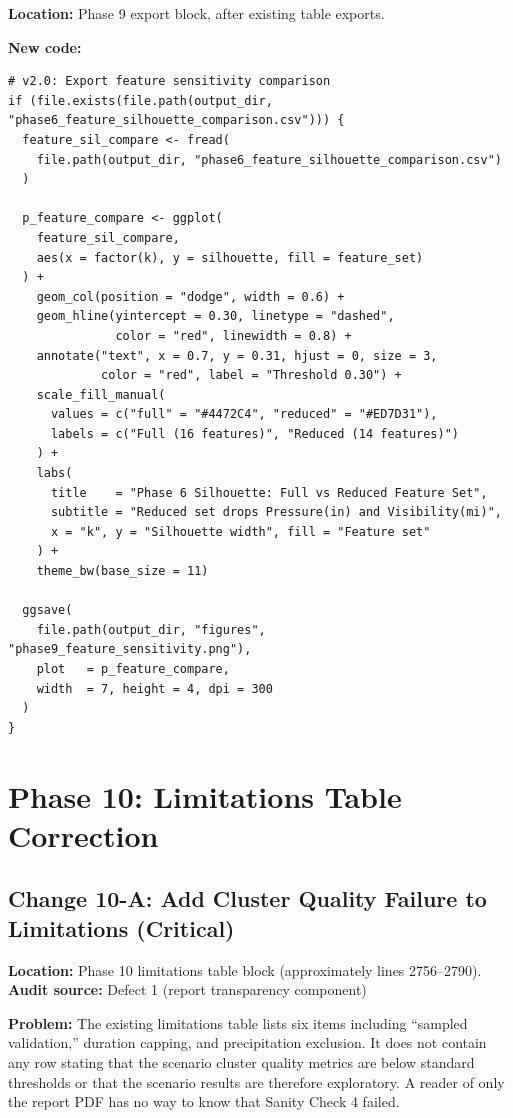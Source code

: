 \documentclass[11pt]{article}
\begin{document}
\textbf{Location:} Phase 9 export block, after existing table exports.

\textbf{New code:}
\begin{lstlisting}
# v2.0: Export feature sensitivity comparison
if (file.exists(file.path(output_dir, "phase6_feature_silhouette_comparison.csv"))) {
  feature_sil_compare <- fread(
    file.path(output_dir, "phase6_feature_silhouette_comparison.csv")
  )

  p_feature_compare <- ggplot(
    feature_sil_compare,
    aes(x = factor(k), y = silhouette, fill = feature_set)
  ) +
    geom_col(position = "dodge", width = 0.6) +
    geom_hline(yintercept = 0.30, linetype = "dashed",
               color = "red", linewidth = 0.8) +
    annotate("text", x = 0.7, y = 0.31, hjust = 0, size = 3,
             color = "red", label = "Threshold 0.30") +
    scale_fill_manual(
      values = c("full" = "#4472C4", "reduced" = "#ED7D31"),
      labels = c("Full (16 features)", "Reduced (14 features)")
    ) +
    labs(
      title    = "Phase 6 Silhouette: Full vs Reduced Feature Set",
      subtitle = "Reduced set drops Pressure(in) and Visibility(mi)",
      x = "k", y = "Silhouette width", fill = "Feature set"
    ) +
    theme_bw(base_size = 11)

  ggsave(
    file.path(output_dir, "figures", "phase9_feature_sensitivity.png"),
    plot   = p_feature_compare,
    width  = 7, height = 4, dpi = 300
  )
}
\end{lstlisting}

\section{Phase 10: Limitations Table Correction}

\subsection{Change 10-A: Add Cluster Quality Failure to Limitations (Critical)}

\textbf{Location:} Phase 10 limitations table block (approximately
lines 2756--2790).\\
\textbf{Audit source:} Defect 1 (report transparency component)

\textbf{Problem:} The existing limitations table lists six items including
``sampled validation,'' duration capping, and precipitation exclusion.
It does not contain any row stating that the scenario cluster quality
metrics are below standard thresholds or that the scenario results are
therefore exploratory. A reader of only the report PDF has no way to
know that Sanity Check 4 failed.
\end{document}
